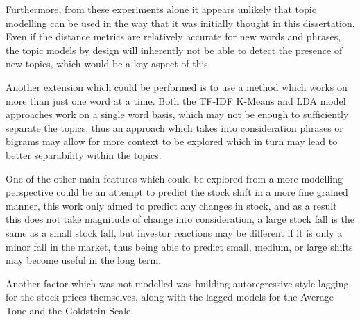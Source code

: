 Furthermore, from these experiments alone it appears unlikely that topic modelling can be used in the way that it was initially thought in this dissertation. Even if the distance metrics are relatively accurate for new words and phrases, the topic models by design will inherently not be able to detect the presence of new topics, which would be a key aspect of this.

Another extension which could be performed is to use a method which works on more than just one word at a time. Both the TF-IDF K-Means and LDA model approaches work on a single word basis, which may not be enough to sufficiently separate the topics, thus an approach which takes into consideration phrases or bigrams may allow for more context to be explored which in turn may lead to better separability within the topics. 

One of the other main features which could be explored from a more modelling perspective could be an attempt to predict the stock shift in a more fine grained manner, this work only aimed to predict any changes in stock, and as a result this does not take magnitude of change into consideration, a large stock fall is the same as a small stock fall, but investor reactions may be different if it is only a minor fall in the market, thus being able to predict small, medium, or large shifts may become useful in the long term. 

Another factor which was not modelled was building autoregressive style lagging for the stock prices themselves, along with the lagged models for the Average Tone and the Goldstein Scale. 

